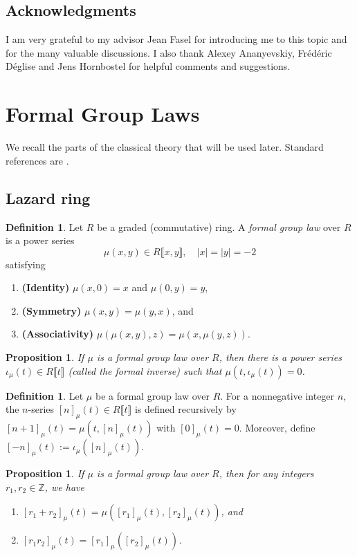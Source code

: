 \documentclass[a4paper]{amsart}
\theoremstyle{plain}
\newtheorem{proposition}[subsubsection]{Proposition}
\theoremstyle{definition}
\newtheorem{definition}[subsubsection]{Definition}
\newcommand{\ZZ}{\mathbb{Z}}
\begin{document}
\subsection*{Acknowledgments}
I am very grateful to my advisor Jean Fasel for introducing me to this topic and for the many valuable discussions. I also thank Alexey Ananyevskiy, Frédéric Déglise and Jens Hornbostel for helpful comments and suggestions.

\section{Formal Group Laws}\label{sec:formal-group-laws}
We recall the parts of the classical theory that will be used later. Standard references are \cite{kochman1996bordism,ravenel1986complex}.
\subsection{Lazard ring}
\begin{definition}
	Let $R$ be a graded (commutative) ring. A \emph{formal group law} over $R$ is a power series
	\[
		\mu(x,y)\in R\llbracket x,y\rrbracket, \quad |x|=|y|=-2
	\]
	satisfying
	\begin{enumerate}
		\item \textbf{(Identity)} $\mu(x,0)=x$ and $\mu(0,y)=y$,
		\item \textbf{(Symmetry)} $\mu(x,y)=\mu(y,x)$, and
		\item \textbf{(Associativity)} $\mu(\mu(x,y),z)=\mu(x,\mu(y,z))$.
	\end{enumerate}
\end{definition}
\begin{proposition}
	If $\mu$ is a formal group law over $R$, then there is a power series $\iota_\mu(t)\in R\llbracket t\rrbracket$ (called the \textit{formal inverse}) such that $\mu(t,\iota_\mu(t))=0$.
\end{proposition}

\begin{definition}
	Let $\mu$ be a formal group law over $R$. For a nonnegative integer $n$, the $n$-series $[n]_\mu(t)\in R\llbracket t\rrbracket$ is defined recursively by $[n+1]_\mu(t)=\mu(t,[n]_\mu(t))$ with $[0]_\mu(t)=0$. Moreover, define $[-n]_\mu(t):=\iota_{\mu}([n]_\mu(t))$.
\end{definition}
\begin{proposition}
	If $\mu$ is a formal group law over $R$, then for any integers $r_1, r_2 \in \ZZ$, we have
	\begin{enumerate}
		\item $[r_1 + r_2]_{\mu}(t) = \mu([r_1]_{\mu}(t), [r_2]_{\mu}(t))$, and
		\item $[r_1 r_2]_{\mu}(t) = [r_1]_{\mu}([r_2]_{\mu}(t))$.
	\end{enumerate}
\end{proposition}
\end{document}
